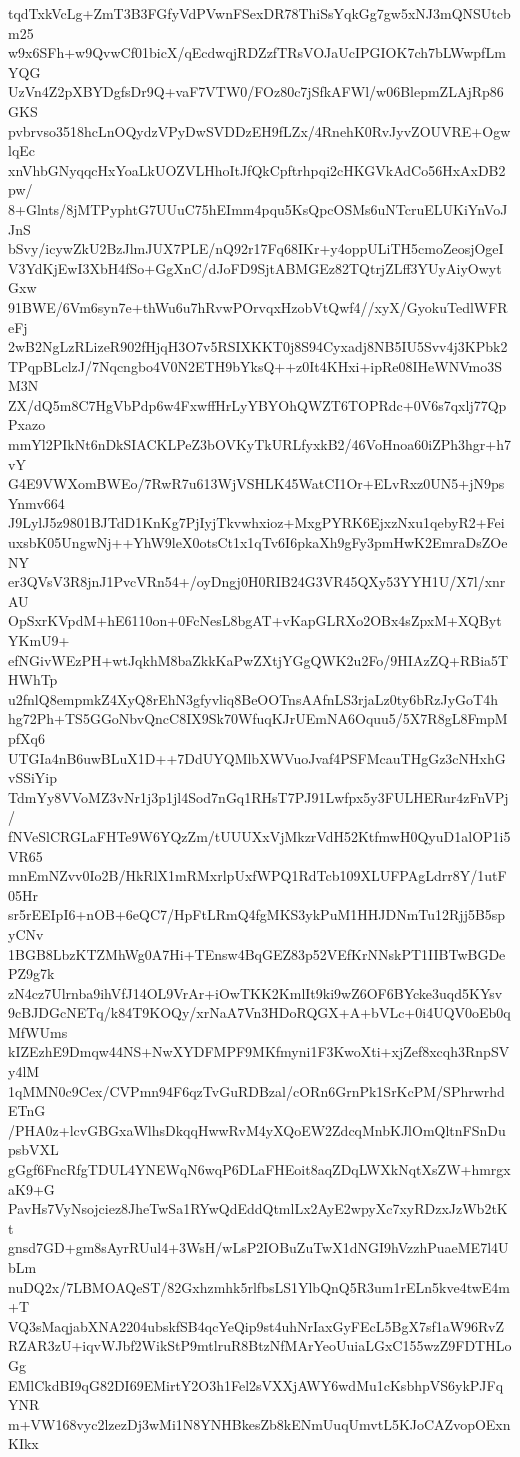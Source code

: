 tqdTxkVcLg+ZmT3B3FGfyVdPVwnFSexDR78ThiSsYqkGg7gw5xNJ3mQNSUtcbm25
w9x6SFh+w9QvwCf01bicX/qEcdwqjRDZzfTRsVOJaUcIPGIOK7ch7bLWwpfLmYQG
UzVn4Z2pXBYDgfsDr9Q+vaF7VTW0/FOz80c7jSfkAFWl/w06BlepmZLAjRp86GKS
pvbrvso3518hcLnOQydzVPyDwSVDDzEH9fLZx/4RnehK0RvJyvZOUVRE+OgwlqEc
xnVhbGNyqqcHxYoaLkUOZVLHhoItJfQkCpftrhpqi2cHKGVkAdCo56HxAxDB2pw/
8+Glnts/8jMTPyphtG7UUuC75hEImm4pqu5KsQpcOSMs6uNTcruELUKiYnVoJJnS
bSvy/icywZkU2BzJlmJUX7PLE/nQ92r17Fq68IKr+y4oppULiTH5cmoZeosjOgeI
V3YdKjEwI3XbH4fSo+GgXnC/dJoFD9SjtABMGEz82TQtrjZLff3YUyAiyOwytGxw
91BWE/6Vm6syn7e+thWu6u7hRvwPOrvqxHzobVtQwf4//xyX/GyokuTedlWFReFj
2wB2NgLzRLizeR902fHjqH3O7v5RSIXKKT0j8S94Cyxadj8NB5IU5Svv4j3KPbk2
TPqpBLclzJ/7Nqcngbo4V0N2ETH9bYksQ++z0It4KHxi+ipRe08IHeWNVmo3SM3N
ZX/dQ5m8C7HgVbPdp6w4FxwffHrLyYBYOhQWZT6TOPRdc+0V6s7qxlj77QpPxazo
mmYl2PIkNt6nDkSIACKLPeZ3bOVKyTkURLfyxkB2/46VoHnoa60iZPh3hgr+h7vY
G4E9VWXomBWEo/7RwR7u613WjVSHLK45WatCI1Or+ELvRxz0UN5+jN9psYnmv664
J9LylJ5z9801BJTdD1KnKg7PjIyjTkvwhxioz+MxgPYRK6EjxzNxu1qebyR2+Fei
uxsbK05UngwNj++YhW9leX0otsCt1x1qTv6I6pkaXh9gFy3pmHwK2EmraDsZOeNY
er3QVsV3R8jnJ1PvcVRn54+/oyDngj0H0RIB24G3VR45QXy53YYH1U/X7l/xnrAU
OpSxrKVpdM+hE6110on+0FcNesL8bgAT+vKapGLRXo2OBx4sZpxM+XQBytYKmU9+
efNGivWEzPH+wtJqkhM8baZkkKaPwZXtjYGgQWK2u2Fo/9HIAzZQ+RBia5THWhTp
u2fnlQ8empmkZ4XyQ8rEhN3gfyvliq8BeOOTnsAAfnLS3rjaLz0ty6bRzJyGoT4h
hg72Ph+TS5GGoNbvQncC8IX9Sk70WfuqKJrUEmNA6Oquu5/5X7R8gL8FmpMpfXq6
UTGIa4nB6uwBLuX1D++7DdUYQMlbXWVuoJvaf4PSFMcauTHgGz3cNHxhGvSSiYip
TdmYy8VVoMZ3vNr1j3p1jl4Sod7nGq1RHsT7PJ91Lwfpx5y3FULHERur4zFnVPj/
fNVeSlCRGLaFHTe9W6YQzZm/tUUUXxVjMkzrVdH52KtfmwH0QyuD1alOP1i5VR65
mnEmNZvv0Io2B/HkRlX1mRMxrlpUxfWPQ1RdTcb109XLUFPAgLdrr8Y/1utF05Hr
sr5rEEIpI6+nOB+6eQC7/HpFtLRmQ4fgMKS3ykPuM1HHJDNmTu12Rjj5B5spyCNv
1BGB8LbzKTZMhWg0A7Hi+TEnsw4BqGEZ83p52VEfKrNNskPT1IIBTwBGDePZ9g7k
zN4cz7Ulrnba9ihVfJ14OL9VrAr+iOwTKK2KmlIt9ki9wZ6OF6BYcke3uqd5KYsv
9cBJDGcNETq/k84T9KOQy/xrNaA7Vn3HDoRQGX+A+bVLc+0i4UQV0oEb0qMfWUms
kIZEzhE9Dmqw44NS+NwXYDFMPF9MKfmyni1F3KwoXti+xjZef8xcqh3RnpSVy4lM
1qMMN0c9Cex/CVPmn94F6qzTvGuRDBzal/cORn6GrnPk1SrKcPM/SPhrwrhdETnG
/PHA0z+lcvGBGxaWlhsDkqqHwwRvM4yXQoEW2ZdcqMnbKJlOmQltnFSnDupsbVXL
gGgf6FncRfgTDUL4YNEWqN6wqP6DLaFHEoit8aqZDqLWXkNqtXsZW+hmrgxaK9+G
PavHs7VyNsojciez8JheTwSa1RYwQdEddQtmlLx2AyE2wpyXc7xyRDzxJzWb2tKt
gnsd7GD+gm8sAyrRUul4+3WsH/wLsP2IOBuZuTwX1dNGI9hVzzhPuaeME7l4UbLm
nuDQ2x/7LBMOAQeST/82Gxhzmhk5rlfbsLS1YlbQnQ5R3um1rELn5kve4twE4m+T
VQ3sMaqjabXNA2204ubskfSB4qcYeQip9st4uhNrIaxGyFEcL5BgX7sf1aW96RvZ
RZAR3zU+iqvWJbf2WikStP9mtlruR8BtzNfMArYeoUuiaLGxC155wzZ9FDTHLoGg
EMlCkdBI9qG82DI69EMirtY2O3h1Fel2sVXXjAWY6wdMu1cKsbhpVS6ykPJFqYNR
m+VW168vyc2lzezDj3wMi1N8YNHBkesZb8kENmUuqUmvtL5KJoCAZvopOExnKIkx
